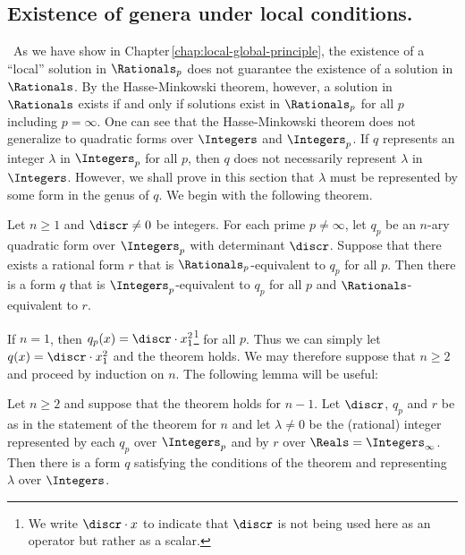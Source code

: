 \subsection{Existence of genera under local conditions.}~As we have show in Chapter\,\ref{chap:local-global-principle}, the existence of a ``local'' solution in \(\Rationals_p\) does not guarantee the existence of a solution in \(\Rationals\). By the Hasse-Minkowski theorem, however, a solution in \(\Rationals\) exists if and only if solutions exist in \(\Rationals_p\) for all \(p\) including \(p = \infty\). One can see that the Hasse-Minkowski theorem does not generalize to quadratic forms over \(\Integers\) and \(\Integers_p\). If \(q\) represents an integer \(\lambda\) in \(\Integers_p\) for all \(p\), then \(q\) does not necessarily represent \(\lambda\) in \(\Integers\). However, we shall prove in this section that \(\lambda\) must be represented by some form in the genus of \(q\). We begin with the following theorem.\label{sec:genus-existence}

\begin{theoremx}\label{thm:genus-existence}
    {\normalfont \cite[p.\,129, 141--143]{cassels2008rational}}
    Let \(n \geq 1\) and \(\discr \neq 0\) be integers. For each prime \(p \neq \infty\), let \(q_p\) be an \(n\)-ary quadratic form over \(\Integers_p\) with determinant \(\discr\). Suppose that there exists a rational form \(r\) that is \(\Rationals_p\)-equivalent to \(q_p\) for all \(p\). Then there is a form \(q\) that is \(\Integers_p\)-equivalent to \(q_p\) for all \(p\) and \(\Rationals\)-equivalent to \(r\).
\end{theoremx}

If \(n = 1\), then \(q_p(x) = \discr \cdot x_1^2\)\footnote{We write \(\discr \cdot x\) to indicate that \(\discr\) is not being used here as an operator but rather as a scalar.} for all \(p\). Thus we can simply let \(q(x) = \discr \cdot x_1^2\) and the theorem holds. We may therefore suppose that \(n \geq 2\) and proceed by induction on \(n\). The following lemma will be useful:

\begin{lemma}
    Let \(n \geq 2\) and suppose that the theorem holds for \(n - 1\). Let \(\discr\), \(q_p\) and \(r\) be as in the statement of the theorem for \(n\) and let \(\lambda \neq 0\) be the (rational) integer represented by each \(q_p\) over \(\Integers_p\) and by \(r\) over \(\Reals = \Integers_{\infty}\). Then there is a form \(q\) satisfying the conditions of the theorem and representing \(\lambda\) over \(\Integers\).
\end{lemma}

